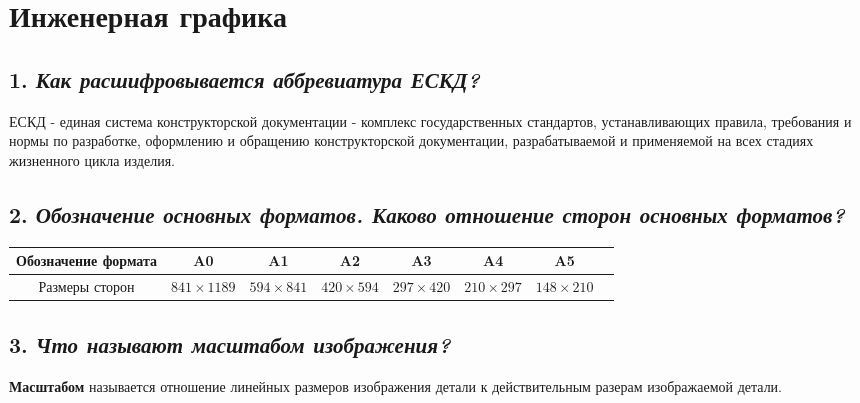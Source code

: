 
    \section*{\textbf{Инженерная графика}}
\subsection*{1. \textit{Как расшифровывается аббревиатура ЕСКД?}}

ЕСКД - единая система конструкторской документации - комплекс государственных стандартов, устанавливающих правила, требования и нормы по разработке, оформлению и обращению конструкторской документации, разрабатываемой и применяемой на всех стадиях жизненного цикла изделия.
\subsection*{2. \textit{Обозначение основных форматов. Каково отношение сторон основных форматов?}}
\begin{center}
\begin{tabular}{|c|c|c|c|c|c|c|c|}
\hline




Обозначение формата&A0&A1&A2&A3&A4&A5&\\ \hline

Размеры сторон&$841\times 1189$&$594\times 841$&$420\times 594$&$297\times 420$&$210\times 297$&$148\times 210$&\\ \hline

\hline
\end{tabular}
\end{center}
\subsection*{3. \textit{Что называют масштабом изображения?}}

\textbf{Масштабом} называется отношение линейных размеров изображения детали к действительным разерам изображаемой детали.
